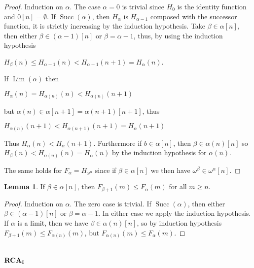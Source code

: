 \documentclass[8pt]{article}
\theoremstyle{definition}
\theoremstyle{definition}
\theoremstyle{definition}
\theoremstyle{definition}
\theoremstyle{definition}
\theoremstyle{definition}
\theoremstyle{definition}
\theoremstyle{definition}
\newtheorem{lemma}{Lemma}[section]
\theoremstyle{definition}
\theoremstyle{definition}
\theoremstyle{definition}
\theoremstyle{definition}
\theoremstyle{definition}
\theoremstyle{question}
\begin{document}
\begin{proof}
  Induction on $\alpha$. The case $\alpha = 0$ is trivial since $H_0$ is the identity function and $0[n] = \emptyset$.
  If $\operatorname{Succ}(\alpha)$, then $H_{\alpha}$ is $H_{\alpha - 1}$ composed with the successor function,
  it is strictly increasing by the induction hypothesis. 
  Take $\beta \in \alpha[n]$, then either $\beta \in (\alpha -1)[n]$ or $\beta = \alpha - 1$, thus, by using the induction hypothesis
  \begin{center}
    $H_{\beta}(n) \leq H_{\alpha - 1}(n) < H_{\alpha - 1}(n + 1) = H_{\alpha}(n)$.
  \end{center}

  If $\operatorname{Lim}(\alpha)$ then 
  \begin{center}
  $H_{\alpha}(n) = H_{\alpha(n)}(n) < H_{\alpha(n)}(n + 1)$
  \end{center}
  but $\alpha(n) \in \alpha[n + 1] = \alpha(n + 1)[n + 1]$, thus
  \begin{center}
    $H_{\alpha(n)}(n + 1) < H_{\alpha(n + 1)}(n + 1) = H_{\alpha}(n + 1)$
  \end{center}
  Thus $H_{\alpha}(n) < H_{\alpha}(n + 1)$. Furthermore if $b \in \alpha[n]$,
  then $\beta \in \alpha(n)[n]$ so $H_{\beta}(n) < H_{\alpha(n)}(n) = H_{\alpha}(n)$ by the induction hypothesis
  for $\alpha(n)$.

  The same holds for $F_{\alpha} = H_{\omega^{\alpha}}$ since if $\beta \in \alpha[n]$ we then have
  $\omega^{\beta} \in \omega^{\alpha}[n]$.
\end{proof}

\begin{lemma}
If $\beta \in \alpha[n]$, then $F_{\beta+1}(m) \leq F_{\alpha}(m)$ for all $m \geq n$.
\end{lemma}

\begin{proof}
Induction on $\alpha$. The zero case is trivial.
If $\operatorname{Succ}(\alpha)$, then either $\beta \in (\alpha - 1)[n]$ or $\beta = \alpha - 1$. In either case
we apply the induction hypothesis. If $\alpha$ is a limit, then we have $\beta \in \alpha(n)[n]$, so
by induction hypothesis $F_{\beta + 1}(m) \leq F_{\alpha(n)}(m)$, but $F_{\alpha(n)}(m) \leq F_{\alpha}(m)$.
\end{proof}

\section{${\bf RCA}_0$}
\end{document}
